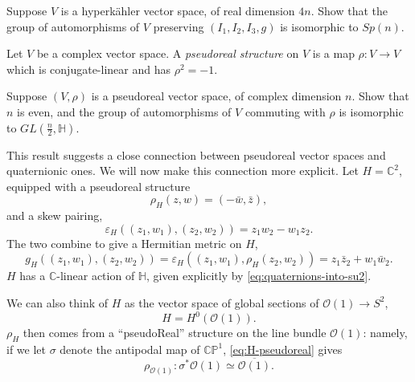 \documentclass[12pt,letterpaper,reqno]{article}
\numberwithin{equation}{section}
\newcommand{\cO}{\ensuremath{\mathcal O}}
\newcommand{\C}{\ensuremath{\mathbb C}}
\newcommand{\PP}{\ensuremath{\mathbb P}}
\newcommand{\bbH}{\ensuremath{\mathbb H}}
\newcommand{\hk}{hyperk\"ahler\xspace}
\newcommand{\ti}[1]{\textit{#1}}
\newcommand{\fixme}[1]{{\color{orange}{[#1]}}}
\begin{document}
\begin{exercise} Suppose $V$ is a \hk vector space, of real dimension $4n$.
Show that the group of automorphisms of $V$ preserving $(I_1,I_2,I_3,g)$
is isomorphic to $Sp(n)$. \fixme{need to use existence of basis}
\end{exercise}

\begin{defn} Let $V$ be a complex
vector space. A \ti{pseudoreal structure}
on $V$ is a map $\rho: V \to V$ which is conjugate-linear
and has $\rho^2 = -1$.
\end{defn}

\begin{exercise} Suppose $(V,\rho)$ is a pseudoreal vector space, of complex 
dimension $n$. Show that $n$ is even, and the group of automorphisms
of $V$ commuting with $\rho$ is isomorphic to $GL(\frac{n}{2}, \bbH)$.
\fixme{need to use standard form for pseudoreal structure?}
\end{exercise}

This result suggests a close connection between pseudoreal vector spaces
and quaternionic ones. We will now make this connection more explicit.
Let $H = \C^2$,
equipped with a pseudoreal structure
\begin{equation} \label{eq:H-pseudoreal}
  \rho_H(z,w) = (-\bar{w},\bar{z}),
\end{equation}
and a skew pairing,
\begin{equation}
  \varepsilon_H((z_1,w_1),(z_2,w_2)) = z_1 w_2 - w_1 z_2.
\end{equation}
The two combine to give a Hermitian metric on $H$,
\begin{equation}
  g_H((z_1,w_1),(z_2,w_2)) = \varepsilon_H((z_1,w_1),\rho_H(z_2,w_2)) = z_1 \bar{z}_2 + w_1 \bar{w}_2.
\end{equation}
$H$ has a $\C$-linear action of $\bbH$,
given explicitly by \eqref{eq:quaternions-into-su2}.

We can also think of $H$ as the vector space of global
sections of $\cO(1) \to S^2$,
\begin{equation}
  H = H^0(\cO(1)).
\end{equation}
$\rho_H$ then comes from a ``pseudoReal'' structure
on the line bundle $\cO(1)$: namely, if we let $\sigma$ denote
the antipodal map of $\C\PP^1$, \eqref{eq:H-pseudoreal} gives
\begin{equation}
  \rho_{\cO(1)}: \sigma^* \cO(1) \simeq \overline{\cO(1)}.
\end{equation}
\end{document}
